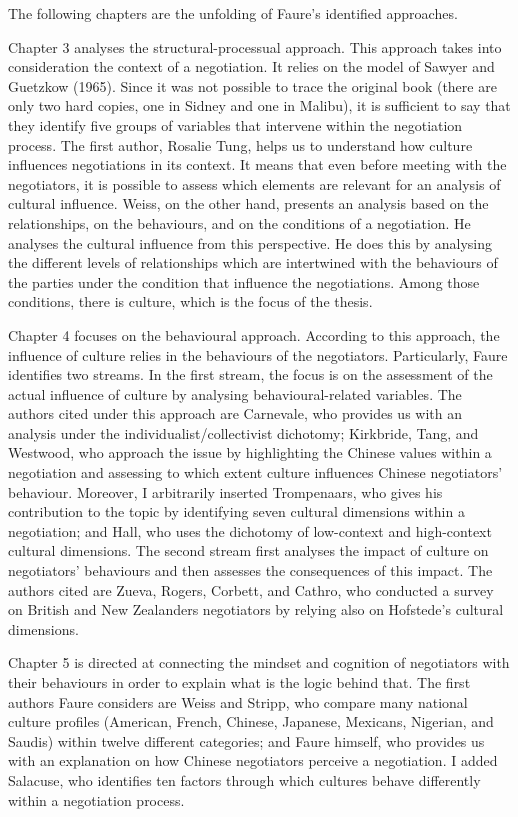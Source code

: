 \documentclass[../main.tex]{subfiles}
\begin{document}
The following chapters are the unfolding of Faure's identified approaches.

Chapter 3 analyses the structural-processual approach. This approach takes into consideration the context of a negotiation. It relies on the model of Sawyer and Guetzkow (1965). Since it was not possible to trace the original book (there are only two hard copies, one in Sidney and one in Malibu), it is sufficient to say that they identify five groups of variables that intervene within the negotiation process.
The first author, Rosalie Tung, helps us to understand how culture influences negotiations in its context. It means that even before meeting with the negotiators, it is possible to assess which elements are relevant for an analysis of cultural influence.
Weiss, on the other hand, presents an analysis based on the relationships, on the behaviours, and on the conditions of a negotiation. He analyses the cultural influence from this perspective. He does this by analysing the different levels of relationships which are intertwined with the behaviours of the parties under the condition that influence the negotiations. Among those conditions, there is culture, which is the focus of the thesis.

Chapter 4 focuses on the behavioural approach. According to this approach, the influence of culture relies in the behaviours of the negotiators.
Particularly, Faure identifies two streams.
In the first stream, the focus is on the assessment of the actual influence of culture by analysing behavioural-related variables. The authors cited under this approach are Carnevale, who provides us with an analysis under the individualist/collectivist dichotomy; Kirkbride, Tang, and Westwood, who approach the issue by highlighting the Chinese values within a negotiation and assessing to which extent culture influences Chinese negotiators' behaviour. Moreover, I arbitrarily inserted Trompenaars, who gives his contribution to the topic by identifying seven cultural dimensions within a negotiation; and Hall, who uses the dichotomy of low-context and high-context cultural dimensions.
The second stream first analyses the impact of culture on negotiators' behaviours and then assesses the consequences of this impact. The authors cited are Zueva, Rogers, Corbett, and Cathro, who conducted a survey on British and New Zealanders negotiators by relying also on Hofstede's cultural dimensions.

Chapter 5 is directed at connecting the mindset and cognition of negotiators with their behaviours in order to explain what is the logic behind that.
The first authors Faure considers are Weiss and Stripp, who compare many national culture profiles (American, French, Chinese, Japanese, Mexicans, Nigerian, and Saudis) within twelve different categories; and Faure himself, who provides us with an explanation on how Chinese negotiators perceive a negotiation. I added Salacuse, who identifies ten factors through which cultures behave differently within a negotiation process.
\end{document}
